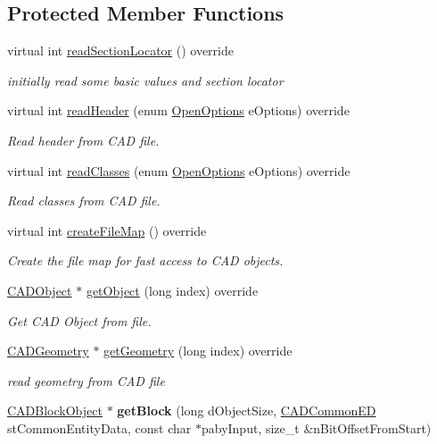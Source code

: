 \subsection*{Protected Member Functions}
\begin{DoxyCompactItemize}
\item 
virtual int \hyperlink{class_d_w_g_file_r2000_ab7e07561e251678368ffecdf6bcedf06}{read\+Section\+Locator} () override
\begin{DoxyCompactList}\small\item\em initially read some basic values and section locator \end{DoxyCompactList}\item 
virtual int \hyperlink{class_d_w_g_file_r2000_a6ffef545cd473a1f2a2639f2941e4946}{read\+Header} (enum \hyperlink{class_c_a_d_file_a4776c7f9fc5888cac0ee6eede900db5a}{Open\+Options} e\+Options) override
\begin{DoxyCompactList}\small\item\em Read header from C\+AD file. \end{DoxyCompactList}\item 
virtual int \hyperlink{class_d_w_g_file_r2000_a9c0571cdd77cbc3c67612ebf8cabeccb}{read\+Classes} (enum \hyperlink{class_c_a_d_file_a4776c7f9fc5888cac0ee6eede900db5a}{Open\+Options} e\+Options) override
\begin{DoxyCompactList}\small\item\em Read classes from C\+AD file. \end{DoxyCompactList}\item 
virtual int \hyperlink{class_d_w_g_file_r2000_a8ac0c8003944b948e3d1f16c713e8e27}{create\+File\+Map} () override
\begin{DoxyCompactList}\small\item\em Create the file map for fast access to C\+AD objects. \end{DoxyCompactList}\item 
\hyperlink{class_c_a_d_object}{C\+A\+D\+Object} $\ast$ \hyperlink{class_d_w_g_file_r2000_a4538211a1567cff8e340d769e8a0d2c3}{get\+Object} (long index) override
\begin{DoxyCompactList}\small\item\em Get C\+AD Object from file. \end{DoxyCompactList}\item 
\hyperlink{class_c_a_d_geometry}{C\+A\+D\+Geometry} $\ast$ \hyperlink{class_d_w_g_file_r2000_a8838da9ee3111f5aba1451aa59528760}{get\+Geometry} (long index) override
\begin{DoxyCompactList}\small\item\em read geometry from C\+AD file \end{DoxyCompactList}\item 
\hyperlink{class_c_a_d_block_object}{C\+A\+D\+Block\+Object} $\ast$ {\bfseries get\+Block} (long d\+Object\+Size, \hyperlink{struct_c_a_d_common_e_d}{C\+A\+D\+Common\+ED} st\+Common\+Entity\+Data, const char $\ast$paby\+Input, size\+\_\+t \&n\+Bit\+Offset\+From\+Start)\hypertarget{class_d_w_g_file_r2000_aa64c4f2a792ef83f9a8ed2632a7421bd}{}\label{class_d_w_g_file_r2000_aa64c4f2a792ef83f9a8ed2632a7421bd}


\end{DoxyCompactItemize}
